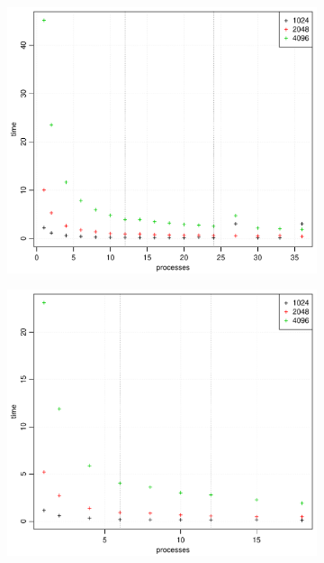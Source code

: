 \begin{figure}[h!]
  \centering
  \begin{subfigure}[b]{0.48\textwidth}
    \includegraphics[width=\textwidth]{./Figures/taskbTimeProc1.pdf}
    \caption{}
    \label{fig:time1}
  \end{subfigure}%
  \quad
  \begin{subfigure}[b]{0.48\textwidth}
    \includegraphics[width=\textwidth]{./Figures/taskbTimeProc2.pdf}
    \caption{}
    \label{fig:time2}

\end{subfigure}
\end{figure}

